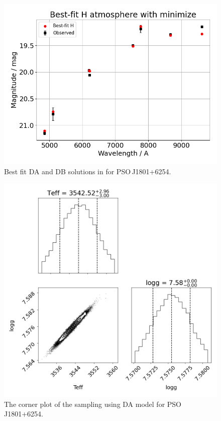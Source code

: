 \documentclass[fleqn,usenatbib]{rasti}
\begin{document}
\begin{figure}
    \centering
    \includegraphics[width=\columnwidth]{PSOJ1801p6254_emcee.png}
    \caption{Best fit DA and DB solutions in for PSO\,J1801+6254.}
    \label{fig:best_fit}
\end{figure}

\begin{figure}
    \centering
    \includegraphics[width=\columnwidth]{PSOJ1801p6254_emcee_corner.png}
    \caption{The corner plot of the sampling using DA model for PSO\,J1801+6254.}
    \label{fig:emcee_corner}
\end{figure}
\end{document}
